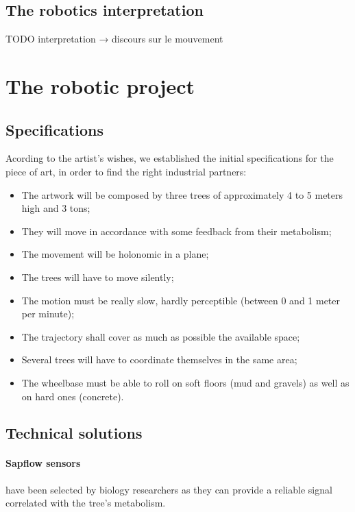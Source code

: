 \documentclass[letterpaper, 10 pt, conference]{IEEEtran}  %
\begin{document}
\subsection{The robotics interpretation}

TODO interpretation → discours sur le mouvement

\section{The robotic project}
\subsection{Specifications}

Acording to the artist's wishes, we established the initial specifications for the piece of art, in order to find the right industrial partners:

\begin{itemize}
    \item The artwork will be composed by three trees of approximately 4 to 5 meters high and 3 tons;
    \item They will move in accordance with some feedback from their metabolism;
    \item The movement will be holonomic in a plane;
    \item The trees will have to move silently;
    \item The motion must be really slow, hardly perceptible (between 0 and 1 meter per minute);
    \item The trajectory shall cover as much as possible the available space;
    \item Several trees will have to coordinate themselves in the same area;
    \item The wheelbase must be able to roll on soft floors (mud and gravels) as well as on hard ones (concrete).
\end{itemize}

\subsection{Technical solutions}

\paragraph{Sapflow sensors} have been selected by biology researchers as they can provide a reliable signal correlated with the tree's metabolism.
\end{document}
